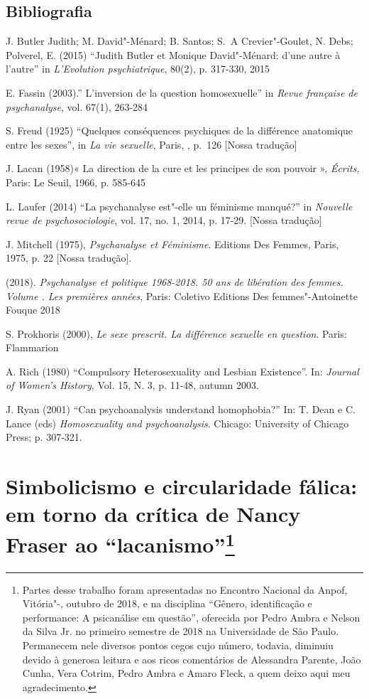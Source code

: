 \section{Bibliografia}

J. Butler Judith; M. David"-Ménard; B. Santos; S.~A Crevier"-Goulet, N.
Debs; Polverel, E. (2015) ``Judith Butler et Monique David"-Ménard: d'une
autre à l'autre'' in \emph{L'Evolution psychiatrique}, 80(2), p.
317-330, 2015

E. Fassin (2003).'' L'inversion de la question homosexuelle'' in
\emph{Revue française de psychanalyse}, vol. 67(1), 263-284

S. Freud (1925) ``Quelques conséquences psychiques de la différence
anatomique entre les sexes'', in \emph{La vie sexuelle}, Paris, ,
p.~126 {[}Nossa tradução{]}

J. Lacan (1958)« La direction de la cure et les principes de son pouvoir
», \emph{Écrits}, Paris: Le Seuil, 1966, p. 585-645

L. Laufer (2014) ``La psychanalyse est"-elle un féminisme manqué?'' in
\emph{Nouvelle revue de psychosociologie}, vol. 17, no. 1, 2014, p.
17-29. {[}Nossa tradução{]}

J. Mitchell (1975), \emph{Psychanalyse et Féminisme}. Editions Des
Femmes, Paris, 1975, p. 22 {[}Nossa tradução{]}.

 (2018). \emph{Psychanalyse et politique 1968-2018. 50 ans de
libération des femmes. Volume . Les premières années}, Paris:
Coletivo Editions Des femmes"-Antoinette Fouque 2018

S. Prokhoris (2000), \emph{Le sexe prescrit. La différence sexuelle en
question}. Paris: Flammarion

A. Rich (1980) ``Compulsory Heterosexuality and Lesbian Existence''.  In:
\emph{Journal of Women's History}, Vol. 15, N. 3, p. 11-48, autumn
2003.

J. Ryan (2001) ``Can psychoanalysis understand homophobia?'' In: T. Dean
e C. Lance (eds) \emph{Homosexuality and psychoanalysis}. Chicago:
University of Chicago Press; p. 307-321.



\chapter*{Simbolicismo e circularidade fálica: em torno da crítica de
Nancy Fraser ao ``lacanismo''\footnote{Partes desse trabalho foram
  apresentadas no  Encontro Nacional da Anpof, Vitória"-, outubro
  de 2018, e na disciplina ``Gênero, identificação e performance: A
  psicanálise em questão'', oferecida por Pedro Ambra e Nelson da Silva
  Jr. no primeiro semestre de 2018 na Universidade de São Paulo.
  Permanecem nele diversos pontos cegos cujo número, todavia, diminuiu
  devido à generosa leitura e aos ricos comentários de Alessandra
  Parente, João Cunha, Vera Cotrim, Pedro Ambra e Amaro Fleck, a quem
  deixo aqui meu agradecimento.}}

